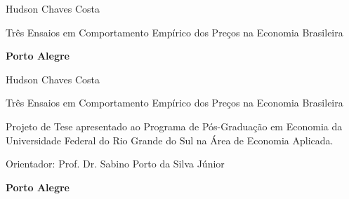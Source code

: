 \documentclass[twoside,a4paper,12pt]{report}
\newcommand{\nomedoaluno}{Hudson Chaves Costa}
\newcommand{\titulo}{Três Ensaios em Comportamento Empírico dos Preços na Economia Brasileira}
\begin{document}

\pagestyle{empty}

\begin{titlepage}


\begin{center}
{\LARGE \nomedoaluno}
\par
\vspace{200pt}
{\Huge \titulo}
\par
\vfill
\textbf{{\large Porto Alegre}\\
{\large \the\year}}
\end{center}
\end{titlepage}

\cleardoublepage




\thispagestyle{empty}

\begin{center}
{\LARGE \nomedoaluno}
\par
\vspace{200pt}
{\Huge \titulo}
\end{center}
\par
\vspace{90pt}
\hspace*{175pt}\parbox{7.6cm}{{\large Projeto de Tese apresentado ao Programa de Pós-Graduação em Economia da Universidade Federal do Rio Grande do Sul na Área de Economia Aplicada.}}

\par
\vspace{1em}
\hspace*{175pt}\parbox{7.6cm}{{\large Orientador: Prof. Dr. Sabino Porto da Silva Júnior}}

\par
\vfill
\begin{center}
\textbf{{\large Porto Alegre}\\
{\large \the\year}}
\end{center}
\end{document}
